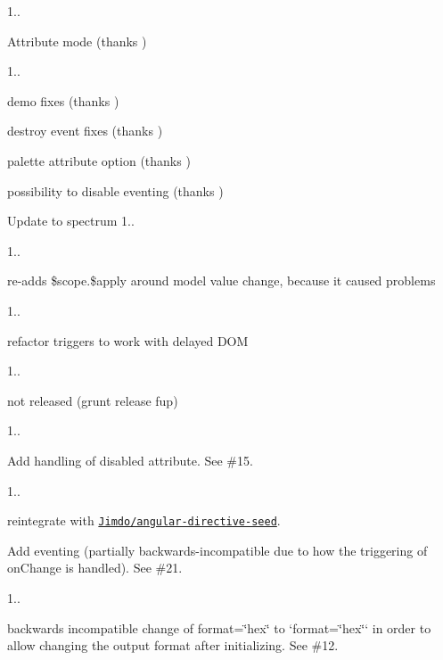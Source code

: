 \begin{DoxyItemize}
\item 1..
\begin{DoxyItemize}
\item Attribute mode (thanks )
\end{DoxyItemize}
\item 1..
\begin{DoxyItemize}
\item demo fixes (thanks )
\item destroy event fixes (thanks )
\item palette attribute option (thanks )
\item possibility to disable eventing (thanks )
\item Update to spectrum 1..
\end{DoxyItemize}
\item 1..
\begin{DoxyItemize}
\item re-\/adds {\ttfamily \$scope.\$apply} around model value change, because it caused problems
\end{DoxyItemize}
\item 1..
\begin{DoxyItemize}
\item refactor triggers to work with delayed D\+OM
\end{DoxyItemize}
\item 1..
\begin{DoxyItemize}
\item not released (grunt release fup)
\end{DoxyItemize}
\item 1..
\begin{DoxyItemize}
\item Add handling of disabled attribute. See \#15.
\end{DoxyItemize}
\item 1..
\begin{DoxyItemize}
\item reintegrate with \href{https://github.com/Jimdo/angular-directive-seed}{\tt Jimdo/angular-\/directive-\/seed}.
\item Add eventing (partially backwards-\/incompatible due to how the triggering of {\ttfamily on\+Change} is handled). See \#21.
\end{DoxyItemize}
\item 1..
\begin{DoxyItemize}
\item backwards incompatible change of {\ttfamily format=\char`\"{}hex\char`\"{}} to `format=\char`\"{}\textquotesingle{}hex\textquotesingle{}\char`\"{}` in order to allow changing the output format after initializing. See \#12.
\end{DoxyItemize}
\end{DoxyItemize}

